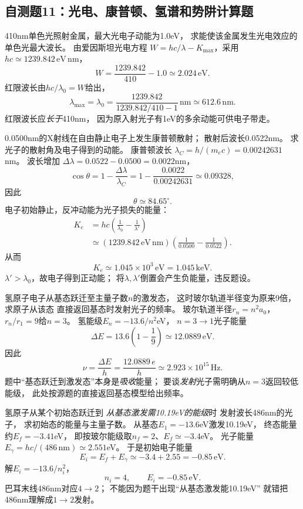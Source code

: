 \subsection{自测题11：光电、康普顿、氢谱和势阱计算题}

\problemtext 410nm单色光照射金属，最大光电子动能为1.0eV，
求能使该金属发生光电效应的单色光最大波长。
\workings
由爱因斯坦光电方程
$W=hc/\lambda-K_{\max}$，采用
$hc\simeq1239.842\,\mathrm{eV\,nm}$，
\[
 W=\frac{1239.842}{410}-1.0
 \simeq2.024\,\mathrm{eV}.
\]
红限波长由$hc/\lambda_0=W$给出，
\[
\boxed{\lambda_{\max}=\lambda_0
=\frac{1239.842}{1239.842/410-1}\,\mathrm{nm}
\simeq612.6\,\mathrm{nm}}.
\]
\crosscheck 红限波长应\emph{长于}410nm，
因为原入射光子有1eV的多余动能可供电子带走。

\problemtext 0.0500nm的X射线在自由静止电子上发生康普顿散射；
散射后波长0.0522nm。
求光子的散射角及电子得到的动能。
\workings
康普顿波长
$\lambda_C=h/(m_ec)=0.00242631$nm。
波长增加
$\Delta\lambda=0.0522-0.0500=0.0022$nm，
\[
\cos\theta=1-\frac{\Delta\lambda}{\lambda_C}
=1-\frac{0.0022}{0.00242631}
\simeq0.09328,
\]
因此
\[
\boxed{\theta\simeq84.65^\circ}.
\]
电子初始静止，反冲动能为光子损失的能量：
\[
\begin{aligned}
K_e&=hc\left(\frac1{\lambda_0}-\frac1{\lambda'}\right)\\
&\simeq(1239.842\,\mathrm{eV\,nm})
\left(\frac1{0.0500}-\frac1{0.0522}\right).
\end{aligned}
\]
从而
\[
\boxed{K_e\simeq1.045\times10^3\,\mathrm{eV}
=1.045\,\mathrm{keV}}.
\]
\crosscheck $\lambda'>\lambda_0$，故电子得到正动能；
将$\lambda,\lambda'$倒置会产生负能量，违反题设。

\problemtext 氢原子电子从基态跃迁至主量子数$n$的激发态，
这时玻尔轨道半径变为原来9倍，求原子从该态
直接返回基态时发射光子的频率。
\workings
玻尔轨道半径$r_n=n^2a_0$，
$r_n/r_1=9$给$n=3$。
氢能级$E_n=-13.6/n^2$eV，
$n=3\to1$光子能量
\[
\Delta E=13.6\left(1-\frac1{9}\right)
\simeq12.0889\,\mathrm{eV}.
\]
因此
\[
\boxed{\nu=\frac{\Delta E}{h}
=\frac{12.0889\,e}{h}
\simeq2.923\times10^{15}\,\mathrm{Hz}}.
\]
\crosscheck 题中“基态跃迁到激发态”本身是\emph{吸收}能量；
要谈\emph{发射}光子需明确从$n=3$返回较低能级，
此处按源题的直接返回基态模型给出频率。

\problemtext 氢原子从某个初始态跃迁到
\emph{从基态激发需10.19eV的能级}时
发射波长486nm的光子，
求初始态的能量与主量子数。
\workings
从基态$E_1=-13.6$eV激发10.19eV，
终态能量约$E_f=-3.41$eV，
即按玻尔能级取$n_f=2$、$E_f\simeq-3.4$eV。
光子能量
$E_\gamma=hc/(486\,\mathrm{nm})\simeq2.551$eV。
于是初始电子能量
\[
E_i=E_f+E_\gamma\simeq-3.4+2.55
=-0.85\,\mathrm{eV}.
\]
解$E_i=-13.6/n_i^2$，
\[
\boxed{n_i=4},\qquad
\boxed{E_i=-0.85\,\mathrm{eV}}.
\]
\crosscheck 巴耳末线486nm对应$4\to2$；
不能因为题干出现“从基态激发能10.19eV”
就错把486nm理解成$1\to2$发射。

